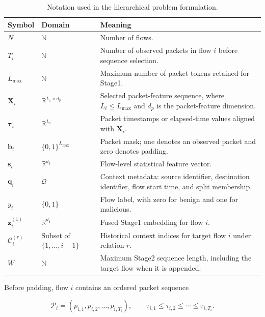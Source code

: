 \begin{table}[t]
\centering
\caption{Notation used in the hierarchical problem formulation.}
\label{tab:problem_notation}
\small
\setlength{\tabcolsep}{5pt}
\renewcommand{\arraystretch}{1.15}
\begin{tabular}{@{}p{2.3cm}p{3.2cm}p{9.7cm}@{}}
\toprule
\textbf{Symbol} & \textbf{Domain} & \textbf{Meaning} \\
\midrule
$N$ & $\mathbb{N}$ & Number of flows. \\
$T_i$ & $\mathbb{N}$ & Number of observed packets in flow $i$ before sequence selection. \\
$L_{\max}$ & $\mathbb{N}$ & Maximum number of packet tokens retained for Stage1. \\
$\mathbf{X}_i$ & $\mathbb{R}^{L_i\times d_p}$ & Selected packet-feature sequence, where $L_i\leq L_{\max}$ and $d_p$ is the packet-feature dimension. \\
$\boldsymbol{\tau}_i$ & $\mathbb{R}^{L_i}$ & Packet timestamps or elapsed-time values aligned with $\mathbf{X}_i$. \\
$\mathbf{b}_i$ & $\{0,1\}^{L_{\max}}$ & Packet mask; one denotes an observed packet and zero denotes padding. \\
$\mathbf{s}_i$ & $\mathbb{R}^{d_f}$ & Flow-level statistical feature vector. \\
$\mathbf{q}_i$ & $\mathcal{Q}$ & Context metadata: source identifier, destination identifier, flow start time, and split membership. \\
$y_i$ & $\{0,1\}$ & Flow label, with zero for benign and one for malicious. \\
$\mathbf{z}^{(1)}_i$ & $\mathbb{R}^{d_1}$ & Fused Stage1 embedding for flow $i$. \\
$\mathcal{C}^{(r)}_i$ & Subset of $\{1,\ldots,i-1\}$ & Historical context indices for target flow $i$ under relation $r$. \\
$W$ & $\mathbb{N}$ & Maximum Stage2 sequence length, including the target flow when it is appended. \\
\bottomrule
\end{tabular}
\end{table}

Before padding, flow $i$ contains an ordered packet sequence

\begin{equation}
\mathcal{P}_i=
\left(p_{i,1},p_{i,2},\ldots,p_{i,T_i}\right),
\qquad
\tau_{i,1}\leq\tau_{i,2}\leq\cdots\leq\tau_{i,T_i}.
\end{equation}

